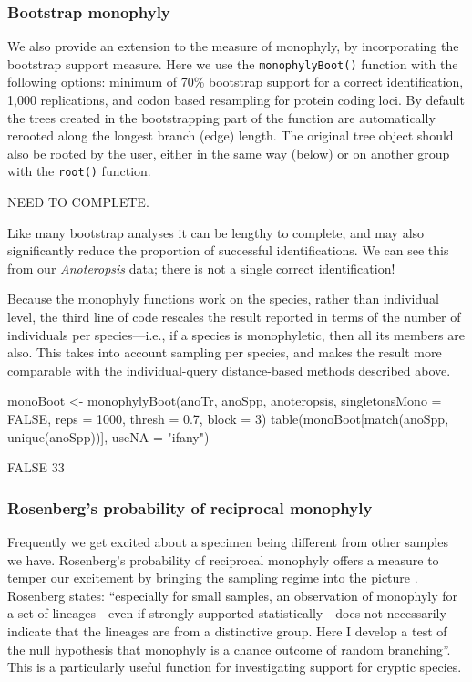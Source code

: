 \documentclass{article}
\newcommand{\fun}[1]{\texttt{#1}}
\begin{document}
\subsubsection{Bootstrap monophyly}

We also provide an extension to the measure of monophyly, by incorporating the bootstrap support measure. Here we use the \fun{monophylyBoot()} function with the following options: minimum of 70\% bootstrap support for a correct identification, 1,000 replications, and codon based resampling for protein coding loci. By default the trees created in the bootstrapping part of the function are automatically rerooted along the longest branch (edge) length. The original tree object should also be rooted by the user, either in the same way (below) or on another group with the \fun{root()} function. 

\begin{console}
NEED TO COMPLETE.
\end{console}

Like many bootstrap analyses it can be lengthy to complete, and may also significantly reduce the proportion of successful identifications. We can see this from our \emph{Anoteropsis} data; there is not a single correct identification!

Because the monophyly functions work on the species, rather than individual level, the third line of code rescales the result reported in terms of the number of individuals per species---i.e., if a species is monophyletic, then all its members are also. This takes into account sampling per species, and makes the result more comparable with the individual-query distance-based methods described above.

\begin{console}
monoBoot <- monophylyBoot(anoTr, anoSpp, anoteropsis, 
singletonsMono = FALSE, reps = 1000, thresh = 0.7, block = 3)
table(monoBoot[match(anoSpp, unique(anoSpp))], useNA = "ifany")
\end{console}

\begin{Routput}
FALSE 
   33
\end{Routput}

\subsubsection{Rosenberg's probability of reciprocal monophyly}
Frequently we get excited about a specimen being different from other samples we have. Rosenberg's probability of reciprocal monophyly offers a measure to temper our excitement by bringing the sampling regime into the picture \citep{Rosenberg2007}. Rosenberg states: ``especially for small samples, an observation of monophyly for a set of lineages---even if strongly supported statistically---does not necessarily indicate that the lineages are from a distinctive group. Here I develop a test of the null hypothesis that monophyly is a chance outcome of random branching''. This is a particularly useful function for investigating support for cryptic species.
\end{document}
